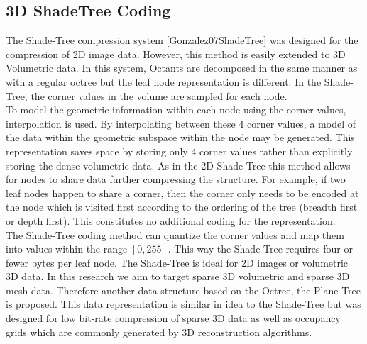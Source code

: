 \subsection{3D ShadeTree Coding}

\label{sec:dr:coding}

The Shade-Tree compression system \ref{Gonzalez07ShadeTree} was designed for the compression of 2D image data. However, this method is easily extended to 3D Volumetric data. In this system, Octants are decomposed in the same manner as with a regular octree but the leaf node representation is different. In the Shade-Tree, the corner values in the volume are sampled for each node.  \\


To model the geometric information within each node using the corner values, interpolation is used. By interpolating between these 4 corner values, a model of the data within the geometric subspace within the node may be generated. This representation saves space by storing only 4 corner values rather than explicitly storing the dense volumetric data. As in the 2D Shade-Tree this method allows for nodes to share data further compressing the structure. For example, if two leaf nodes happen to share a corner, then the corner only needs to be encoded at the node which is visited first according to the ordering of the tree (breadth first or depth first). This constitutes no additional coding for the representation. \\

The Shade-Tree coding method can quantize the corner values and map them into values within the range $[0,255]$. This way the Shade-Tree requires four or fewer bytes per leaf node. The Shade-Tree is ideal for 2D images or volumetric 3D data. In this research we aim to target sparse 3D volumetric and sparse 3D mesh data. Therefore another data structure based on the Octree, the Plane-Tree is proposed. This data representation is similar in idea to the Shade-Tree but was designed for low bit-rate compression of sparse 3D data as well as occupancy grids which are commonly generated by 3D reconstruction algorithms. \\


